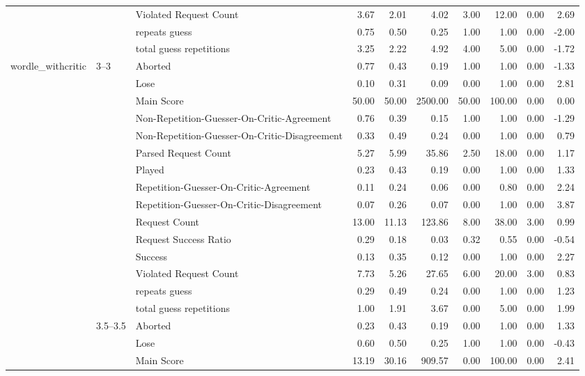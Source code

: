 \begin{tabular}{lllrrrrrrr}
 &  & Violated Request Count & 3.67 & 2.01 & 4.02 & 3.00 & 12.00 & 0.00 & 2.69 \\
 &  & repeats guess & 0.75 & 0.50 & 0.25 & 1.00 & 1.00 & 0.00 & -2.00 \\
 &  & total guess repetitions & 3.25 & 2.22 & 4.92 & 4.00 & 5.00 & 0.00 & -1.72 \\
\cline{1-10} \cline{2-10}
\multirow[t]{165}{*}{wordle_withcritic} & \multirow[t]{15}{*}{3--3} & Aborted & 0.77 & 0.43 & 0.19 & 1.00 & 1.00 & 0.00 & -1.33 \\
 &  & Lose & 0.10 & 0.31 & 0.09 & 0.00 & 1.00 & 0.00 & 2.81 \\
 &  & Main Score & 50.00 & 50.00 & 2500.00 & 50.00 & 100.00 & 0.00 & 0.00 \\
 &  & Non-Repetition-Guesser-On-Critic-Agreement & 0.76 & 0.39 & 0.15 & 1.00 & 1.00 & 0.00 & -1.29 \\
 &  & Non-Repetition-Guesser-On-Critic-Disagreement & 0.33 & 0.49 & 0.24 & 0.00 & 1.00 & 0.00 & 0.79 \\
 &  & Parsed Request Count & 5.27 & 5.99 & 35.86 & 2.50 & 18.00 & 0.00 & 1.17 \\
 &  & Played & 0.23 & 0.43 & 0.19 & 0.00 & 1.00 & 0.00 & 1.33 \\
 &  & Repetition-Guesser-On-Critic-Agreement & 0.11 & 0.24 & 0.06 & 0.00 & 0.80 & 0.00 & 2.24 \\
 &  & Repetition-Guesser-On-Critic-Disagreement & 0.07 & 0.26 & 0.07 & 0.00 & 1.00 & 0.00 & 3.87 \\
 &  & Request Count & 13.00 & 11.13 & 123.86 & 8.00 & 38.00 & 3.00 & 0.99 \\
 &  & Request Success Ratio & 0.29 & 0.18 & 0.03 & 0.32 & 0.55 & 0.00 & -0.54 \\
 &  & Success & 0.13 & 0.35 & 0.12 & 0.00 & 1.00 & 0.00 & 2.27 \\
 &  & Violated Request Count & 7.73 & 5.26 & 27.65 & 6.00 & 20.00 & 3.00 & 0.83 \\
 &  & repeats guess & 0.29 & 0.49 & 0.24 & 0.00 & 1.00 & 0.00 & 1.23 \\
 &  & total guess repetitions & 1.00 & 1.91 & 3.67 & 0.00 & 5.00 & 0.00 & 1.99 \\
\cline{2-10}
 & \multirow[t]{15}{*}{3.5--3.5} & Aborted & 0.23 & 0.43 & 0.19 & 0.00 & 1.00 & 0.00 & 1.33 \\
 &  & Lose & 0.60 & 0.50 & 0.25 & 1.00 & 1.00 & 0.00 & -0.43 \\
 &  & Main Score & 13.19 & 30.16 & 909.57 & 0.00 & 100.00 & 0.00 & 2.41 \\

\end{tabular}
